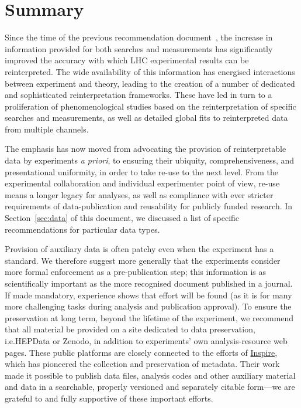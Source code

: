 \documentclass[a4paper,aps,prd,longbibliography,notitlepage,showpacs,amsmath,amssymb,superscriptaddress,nofootinbib,floatfix,11pt,preprintnumbers]{revtex4-1-mod}
\newcommand{\hepdata}{\textsf{HEPData}\xspace}
\newcommand{\zenodo}{\textsf{Zenodo}\xspace}
\newcommand{\ie}{i.e.\xspace}
\renewcommand{\emph}[1]{\textit{#1}}
\begin{document}
\section{Summary} \label{sec:execsumm}

Since the time of the previous recommendation document~\cite{Brooijmans:2012yi}, the increase in information provided for both searches and measurements has significantly improved the accuracy with which LHC experimental results can be reinterpreted.  The wide availability of this information has energised interactions between experiment and theory, leading to the creation of a number of dedicated and sophisticated reinterpretation frameworks.
These have led in turn to a proliferation of phenomenological studies based on the reinterpretation of specific searches and measurements, as well as detailed global fits to reinterpreted data from multiple channels.

The emphasis has now moved from advocating the provision of reinterpretable data by experiments \emph{a priori}, to ensuring their ubiquity, comprehensiveness, and presentational uniformity, in order to take re-use to the next level. From the experimental collaboration and individual experimenter point of view, re-use means a longer legacy for analyses, as well as compliance with ever stricter requirements of data-publication and reusability for publicly funded research. In Section~\ref{sec:data} of this document, we discussed a list of specific recommendations for particular data types.

Provision of auxiliary data is often patchy even when the experiment has a standard. We therefore suggest more generally that the experiments consider more formal enforcement as a pre-publication step; this information is as scientifically important as the more recognised document published in a journal. If made mandatory, experience shows that effort will be found (as it is for many more challenging tasks during analysis and publication approval).
To ensure the preservation at long term, beyond the lifetime of the experiment, we recommend that all material be provided on a site dedicated to data preservation, \ie \hepdata or \zenodo, in addition to experiments' own analysis-resource web pages.
These public platforms are closely connected to the efforts of \href{http://www.inspirehep.net}{\textsf{Inspire}}, which has pioneered the collection and
preservation of metadata. Their work made it possible to publish data files, analysis codes and other auxiliary material and data in a searchable, properly versioned and separately citable form---we are grateful to and fully supportive of these important efforts.
\end{document}
